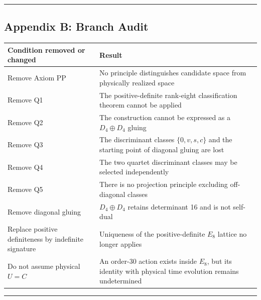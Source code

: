 \documentclass[
  a4paper,
]{article}
\newcounter{none} %
\begin{document}
\begin{center}\rule{0.5\linewidth}{0.5pt}\end{center}

\subsection{Appendix B: Branch Audit}\label{appendix-b-branch-audit}

{\def\LTcaptype{none} %
\begin{longtable}[]{@{}
  >{\raggedright\arraybackslash}p{}
  >{\raggedright\arraybackslash}p{}@{}}
\toprule\noalign{}
\begin{minipage}[b]{\linewidth}\raggedright
Condition removed or changed
\end{minipage} & \begin{minipage}[b]{\linewidth}\raggedright
Result
\end{minipage} \\
\midrule\noalign{}
\endhead
\bottomrule\noalign{}
\endlastfoot
Remove Axiom PP & No principle distinguishes candidate space from
physically realized space \\
Remove Q1 & The positive-definite rank-eight classification theorem
cannot be applied \\
Remove Q2 & The construction cannot be expressed as a \(D_4\oplus D_4\)
gluing \\
Remove Q3 & The discriminant classes \(\{0,v,s,c\}\) and the starting
point of diagonal gluing are lost \\
Remove Q4 & The two quartet discriminant classes may be selected
independently \\
Remove Q5 & There is no projection principle excluding off-diagonal
classes \\
Remove diagonal gluing & \(D_4\oplus D_4\) retains determinant 16 and is
not self-dual \\
Replace positive definiteness by indefinite signature & Uniqueness of
the positive-definite \(E_8\) lattice no longer applies \\
Do not assume physical \(U=C\) & An order-30 action exists inside
\(E_8\), but its identity with physical time evolution remains
undetermined \\
\end{longtable}
}

\begin{center}\rule{0.5\linewidth}{0.5pt}\end{center}
\end{document}
